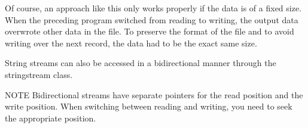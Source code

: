 Of course, an approach like this only works properly if the data is of a fixed size. When the preceding program switched from reading to writing, the output data overwrote other data in the file. To preserve the format of the file and to avoid writing over the next record, the data had to be the exact same size.

String streams can also be accessed in a bidirectional manner through the stringstream class.

\begin{myNotic}{NOTE}
Bidirectional streams have separate pointers for the read position and the write position. When switching between reading and writing, you need to seek the appropriate position.
\end{myNotic}















